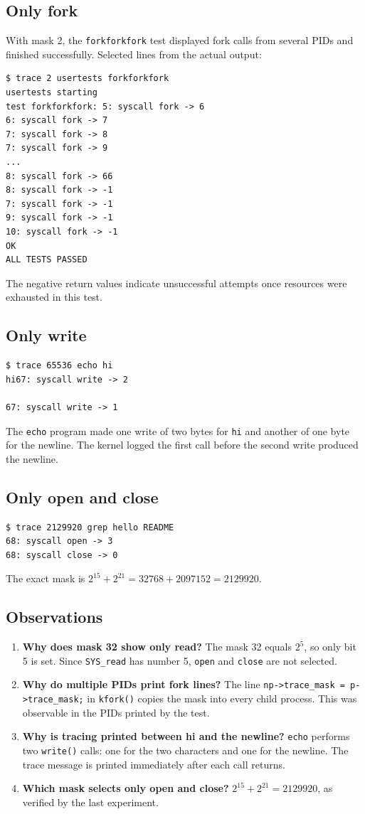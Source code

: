 \documentclass[12pt,a4paper]{article}
\begin{document}
\subsection{Only fork}
With mask 2, the \texttt{forkforkfork} test displayed fork calls from several PIDs and finished successfully. Selected lines from the actual output:
\begin{lstlisting}
$ trace 2 usertests forkforkfork
usertests starting
test forkforkfork: 5: syscall fork -> 6
6: syscall fork -> 7
7: syscall fork -> 8
7: syscall fork -> 9
...
8: syscall fork -> 66
8: syscall fork -> -1
7: syscall fork -> -1
9: syscall fork -> -1
10: syscall fork -> -1
OK
ALL TESTS PASSED
\end{lstlisting}
The negative return values indicate unsuccessful attempts once resources were exhausted in this test.
\subsection{Only write}
\begin{lstlisting}
$ trace 65536 echo hi
hi67: syscall write -> 2

67: syscall write -> 1
\end{lstlisting}
The \texttt{echo} program made one write of two bytes for \texttt{hi} and another of one byte for the newline. The kernel logged the first call before the second write produced the newline.
\subsection{Only open and close}
\begin{lstlisting}
$ trace 2129920 grep hello README
68: syscall open -> 3
68: syscall close -> 0
\end{lstlisting}
The exact mask is \(2^{15}+2^{21}=32768+2097152=2129920\).

\subsection{Observations}
\begin{enumerate}[leftmargin=*]
\item \textbf{Why does mask 32 show only read?} The mask 32 equals \(2^5\), so only bit 5 is set. Since \texttt{SYS\_read} has number 5, \texttt{open} and \texttt{close} are not selected.
\item \textbf{Why do multiple PIDs print fork lines?} The line \texttt{np->trace\_mask = p->trace\_mask;} in \texttt{kfork()} copies the mask into every child process. This was observable in the PIDs printed by the test.
\item \textbf{Why is tracing printed between hi and the newline?} \texttt{echo} performs two \texttt{write()} calls: one for the two characters and one for the newline. The trace message is printed immediately after each call returns.
\item \textbf{Which mask selects only open and close?} \(2^{15}+2^{21}=2129920\), as verified by the last experiment.
\end{enumerate}
\end{document}
